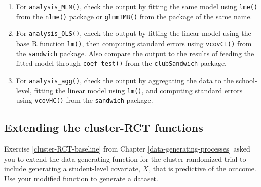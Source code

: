 \documentclass[
]{book}
\begin{document}
\begin{enumerate}
\def\labelenumi{\arabic{enumi}.}
\item
  For \texttt{analysis\_MLM()}, check the output by fitting the same model using \texttt{lme()} from the \texttt{nlme()} package or \texttt{glmmTMB()} from the package of the same name.
\item
  For \texttt{analysis\_OLS()}, check the output by fitting the linear model using the base R function \texttt{lm()}, then computing standard errors using \texttt{vcovCL()} from the \texttt{sandwich} package. Also compare the output to the results of feeding the fitted model through \texttt{coef\_test()} from the \texttt{clubSandwich} package.
\item
  For \texttt{analysis\_agg()}, check the output by aggregating the data to the school-level, fitting the linear model using \texttt{lm()}, and computing standard errors using \texttt{vcovHC()} from the \texttt{sandwich} package.
\end{enumerate}

\subsection{Extending the cluster-RCT functions}\label{CRT-ANCOVA-estimators}

Exercise \ref{cluster-RCT-baseline} from Chapter \ref{data-generating-processes} asked you to extend the data-generating function for the cluster-randomized trial to include generating a student-level covariate, \(X\), that is predictive of the outcome.
Use your modified function to generate a dataset.
\end{document}
